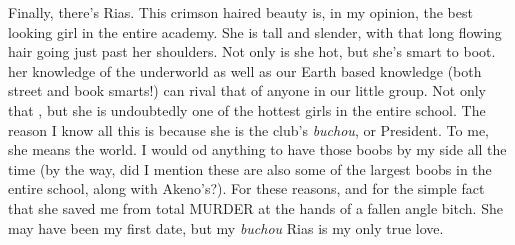 \documentclass{article}
\begin{document}
Finally, there's Rias. This crimson haired beauty is, in my opinion, the best looking girl in the entire academy. She is tall and slender, with that long flowing hair going just past her shoulders. Not only is she hot, but she's smart to boot. her knowledge of the underworld as well as our Earth based knowledge (both street and book smarts!) can rival that of anyone in our little group. Not only that , but she is undoubtedly one of the hottest girls in the entire school. The reason I know all this is because she is the club's \emph{buchou}, or President. To me, she means the world. I would od anything to have those boobs by my side all the time (by the way, did I mention these are also some of the largest boobs in the entire school, along with Akeno's?). For these reasons, and for the simple fact that she saved me from total MURDER at the hands of a fallen angle bitch. She may have been my first date, but my \emph{buchou} Rias is my only true love.
\end{document}
